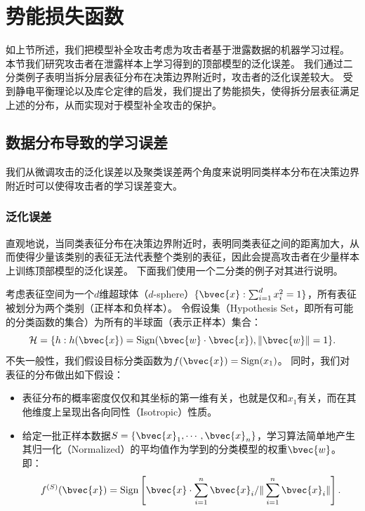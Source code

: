 \section{势能损失函数}
如上节所述，我们把模型补全攻击考虑为攻击者基于泄露数据的机器学习过程。
%
本节我们研究攻击者在泄露样本上学习得到的顶部模型的泛化误差。
我们通过二分类例子表明当拆分层表征分布在决策边界附近时，攻击者的泛化误差较大。
%
受到静电平衡理论以及库仑定律的启发，我们提出了势能损失，使得拆分层表征满足上述的分布，从而实现对于模型补全攻击的保护。
%

\subsection{数据分布导致的学习误差}
我们从微调攻击的泛化误差以及聚类误差两个角度来说明同类样本分布在决策边界附近时可以使得攻击者的学习误差变大。


\subsubsection{泛化误差}
直观地说，当同类表征分布在决策边界附近时，表明同类表征之间的距离加大，从而使得少量该类别的表征无法代表整个类别的表征，因此会提高攻击者在少量样本上训练顶部模型的泛化误差。
%
下面我们使用一个二分类的例子对其进行说明。
%

考虑表征空间为一个$d$维超球体（$d$-sphere）$\{ \bvec{x}: \sum_{i=1}^d x_i^2 = 1\}$，所有表征被划分为两个类别（正样本和负样本）。
令假设集（Hypothesis Set，即所有可能的分类函数的集合）为所有的半球面（表示正样本）集合：
\begin{equation}
    \mathcal H = \{ h: h(\bvec{x}) = \text{Sign}(\bvec{w} \cdot \bvec{x}), \Vert \bvec{w} \Vert = 1\}.
\end{equation}
不失一般性，我们假设目标分类函数为$f(\bvec{x}) = \text{Sign}(x_1)$。
同时，我们对表征的分布做出如下假设：
\begin{itemize}
    \item 表征分布的概率密度仅仅和其坐标的第一维有关，也就是仅和$x_1$有关，而在其他维度上呈现出各向同性（Isotropic）性质。
    \item 给定一批正样本数据$S = \{\bvec{x}_1, \cdots, \bvec{x}_n\}$，学习算法简单地产生其归一化（Normalized）的平均值作为学到的分类模型的权重$\bvec{w}$。
    即：
    \begin{equation}
        f^{(S)}(\bvec{x}) = \text{Sign}\left[ \bvec{x} \cdot \sum_{i=1}^n {\bvec{x}_i} / \Vert \sum_{i=1}^n {\bvec{x}_i}\Vert \right].
    \end{equation}
\end{itemize}

